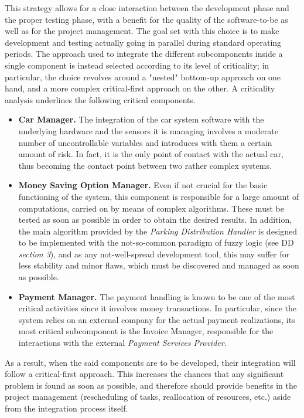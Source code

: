 	This strategy allows for a close interaction between the development phase and the proper testing phase, with a benefit for the quality of the software-to-be as well as for the project management. The goal set with this choice is to make development and testing actually going in parallel during standard operating periods. %
	The approach used to integrate the different subcomponents inside a single component is instead selected according to its level of criticality; in particular, the choice revolves around a "nested" bottom-up approach on one hand, and a more complex critical-first approach on the other.
	A criticality analysis underlines the following critical components.
	\begin{itemize}
		\item \textbf{Car Manager.} The integration of the car system software with the underlying hardware and the sensors it is managing involves a moderate number of uncontrollable variables and introduces with them a certain amount of risk. In fact, it is the only point of contact with the actual car, thus becoming the contact point between two rather complex systems.
		\item \textbf{Money Saving Option Manager.} Even if not crucial for the basic functioning of the system, this component is responsible for a large amount of computations, carried on by means of complex algorithms. These must be tested as soon as possible in order to obtain the desired results. In addition, the main algorithm provided by the \textit{Parking Distribution Handler} is designed to be implemented with the not-so-common paradigm of fuzzy logic (see DD \textit{section 3}), and as any not-well-spread development tool, this may suffer for less stability and minor flaws, which must be discovered and managed as soon as possible.
		\item \textbf{Payment Manager.} The payment handling is known to be one of the most critical activities since it involves money transactions. In particular, since the system relies on an external company for the actual payment realizations, its most critical subcomponent is the Invoice Manager, responsible for the interactions with the external \textit{Payment Services Provider}.
	\end{itemize}
	As a result, when the said components are to be developed, their integration will follow a critical-first approach. This increases the chances that any significant problem is found as soon as possible, and therefore should provide benefits in the project management (rescheduling of tasks, reallocation of resources, etc.) aside from the integration process itself.

